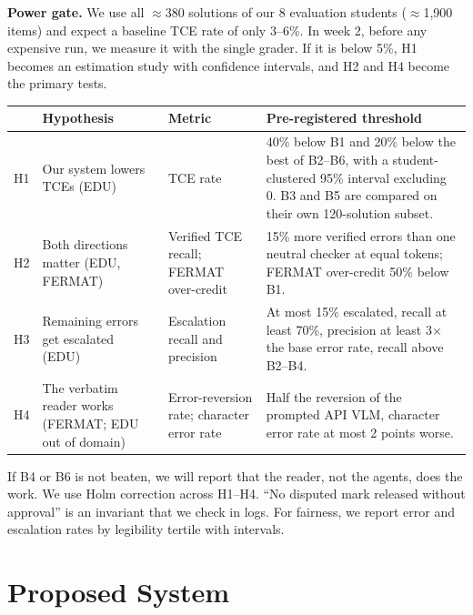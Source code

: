 \documentclass[11pt,a4paper]{article}
\begin{document}
\textbf{Power gate.} We use all $\approx$380 solutions of our 8 evaluation students ($\approx$1,900 items) and expect a baseline TCE rate of only 3--6\%. In week 2, before any expensive run, we measure it with the single grader. If it is below 5\%, H1 becomes an estimation study with confidence intervals, and H2 and H4 become the primary tests.

\begin{center}
\footnotesize
\begin{tabularx}{\textwidth}{@{}P{0.6cm}P{3.5cm}P{2.8cm}Y@{}}
\toprule
 & Hypothesis & Metric & Pre-registered threshold \\
\midrule
H1 & Our system lowers TCEs (EDU) & TCE rate & 40\% below B1 and 20\% below the best of B2--B6, with a student-clustered 95\% interval excluding 0. B3 and B5 are compared on their own 120-solution subset. \\
H2 & Both directions matter (EDU, FERMAT) & Verified TCE recall; FERMAT over-credit & 15\% more verified errors than one neutral checker at equal tokens; FERMAT over-credit 50\% below B1. \\
H3 & Remaining errors get escalated (EDU) & Escalation recall and precision & At most 15\% escalated, recall at least 70\%, precision at least 3$\times$ the base error rate, recall above B2--B4. \\
H4 & The verbatim reader works (FERMAT; EDU out of domain) & Error-reversion rate; character error rate & Half the reversion of the prompted API VLM, character error rate at most 2 points worse. \\
\bottomrule
\end{tabularx}
\end{center}

If B4 or B6 is not beaten, we will report that the reader, not the agents, does the work. We use Holm correction across H1--H4. ``No disputed mark released without approval'' is an invariant that we check in logs. For fairness, we report error and escalation rates by legibility tertile with intervals.

\section{Proposed System}
\end{document}
